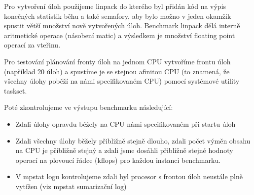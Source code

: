 \documentclass[a4paper,12pt]{article}
\begin{document}
Pro vytvoření úloh použijeme linpack do kterého byl přidán kód na výpis konečných statistik běhu a také semafory, aby bylo možno v jeden okamžik spustit větší množství nově vytvořených úloh. Benchmark linpack dělá interně aritmetické operace (násobení matic) a výsledkem je množství floating point operací za vteřinu. 

Pro testování plánování fronty úloh na jednom CPU vytvoříme frontu úloh (například 20 úloh) a spustíme je se stejnou afinitou CPU (to znamená, že všechny úlohy poběží na námi specifikovaném CPU) pomocí systémové utility taskset.

Poté zkontrolujeme ve výstupu benchmarku následující:
\begin{itemize}
\item Zdali úlohy opravdu běžely na CPU námi specifikovaném při startu úloh
\item Zdali všechny úlohy běžely přibližně stejně dlouho, zdali počet výměn obsahu na CPU je přibližně stejný  a zdali jsme dosáhli přibližně stejné hodnoty operací na plovoucí řádce (kflops) pro každou instanci benchmarku.
\item V mpstat logu kontrolujeme zdali byl procesor s frontou úloh neustále plně vytížen (viz mpstat sumarizační log)
\end{itemize}
\end{document}
